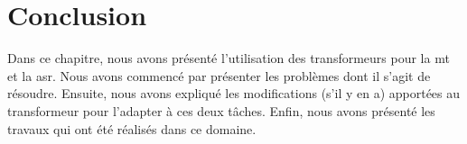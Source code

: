 \section{Conclusion}

Dans ce chapitre, nous avons présenté l'utilisation des transformeurs pour la \gls{mt} et la \gls{asr}.
Nous avons commencé par présenter les problèmes dont il s'agit de résoudre.
Ensuite, nous avons expliqué les modifications (s'il y en a) 
apportées au transformeur pour l'adapter à ces deux tâches.
Enfin, nous avons présenté les travaux qui ont été réalisés dans ce domaine.